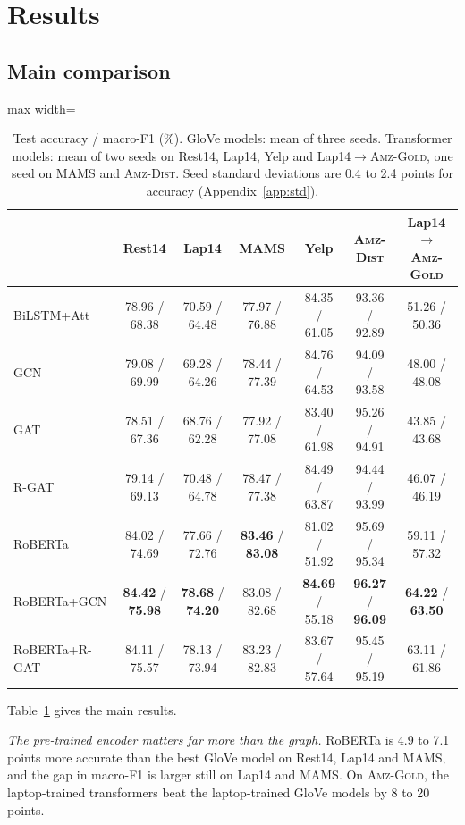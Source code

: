 \documentclass[11pt]{article}
\newcommand{\gold}{\textsc{Amz-Gold}}
\newcommand{\dist}{\textsc{Amz-Dist}}
\begin{document}
\section{Results}

\subsection{Main comparison}

\begin{table}[t]
\centering
\small
\begin{adjustbox}{max width=\textwidth}
\begin{tabular}{lcccccc}
\toprule
 & Rest14 & Lap14 & MAMS & Yelp & \dist & Lap14 $\rightarrow$ \gold \\
\midrule
BiLSTM+Att & 78.96 / 68.38 & 70.59 / 64.48 & 77.97 / 76.88 & 84.35 / 61.05 & 93.36 / 92.89 & 51.26 / 50.36 \\
GCN & 79.08 / 69.99 & 69.28 / 64.26 & 78.44 / 77.39 & 84.76 / 64.53 & 94.09 / 93.58 & 48.00 / 48.08 \\
GAT & 78.51 / 67.36 & 68.76 / 62.28 & 77.92 / 77.08 & 83.40 / 61.98 & 95.26 / 94.91 & 43.85 / 43.68 \\
R-GAT & 79.14 / 69.13 & 70.48 / 64.78 & 78.47 / 77.38 & 84.49 / 63.87 & 94.44 / 93.99 & 46.07 / 46.19 \\
\midrule
RoBERTa & 84.02 / 74.69 & 77.66 / 72.76 & \textbf{83.46} / \textbf{83.08} & 81.02 / 51.92 & 95.69 / 95.34 & 59.11 / 57.32 \\
RoBERTa+GCN & \textbf{84.42} / \textbf{75.98} & \textbf{78.68} / \textbf{74.20} & 83.08 / 82.68 & \textbf{84.69} / 55.18 & \textbf{96.27} / \textbf{96.09} & \textbf{64.22} / \textbf{63.50} \\
RoBERTa+R-GAT & 84.11 / 75.57 & 78.13 / 73.94 & 83.23 / 82.83 & 83.67 / 57.64 & 95.45 / 95.19 & 63.11 / 61.86 \\
\bottomrule
\end{tabular}
\end{adjustbox}
\caption{Test accuracy / macro-F1 (\%). GloVe models: mean of three seeds. Transformer models: mean of two seeds on Rest14, Lap14, Yelp and Lap14$\rightarrow$\gold, one seed on MAMS and \dist. Seed standard deviations are 0.4 to 2.4 points for accuracy (Appendix~\ref{app:std}).}
\label{tab:main}
\end{table}

Table~\ref{tab:main} gives the main results.

\textit{The pre-trained encoder matters far more than the graph.} RoBERTa is 4.9 to 7.1 points more accurate than the best GloVe model on Rest14, Lap14 and MAMS, and the gap in macro-F1 is larger still on Lap14 and MAMS. On \gold, the laptop-trained transformers beat the laptop-trained GloVe models by 8 to 20 points.
\end{document}
